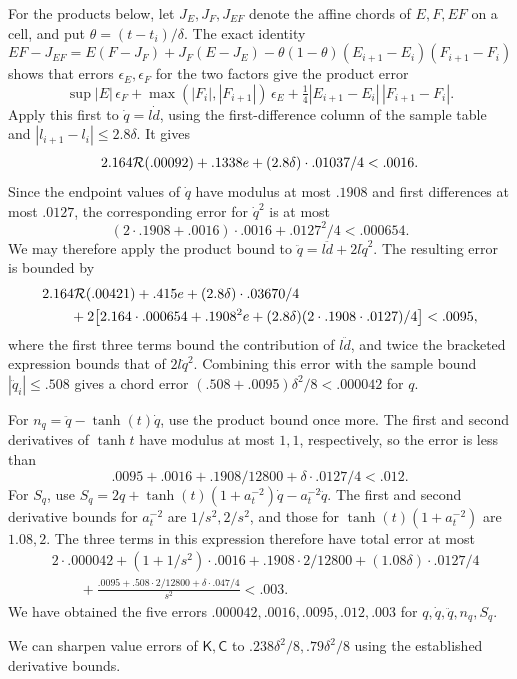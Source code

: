 For the products below, let \(J_E,J_F,J_{EF}\) denote the affine
chords of \(E,F,EF\) on a cell, and put
\(\theta=(t-t_i)/\delta\). The exact identity
\[
 EF-J_{EF}
 =E(F-J_F)+J_F(E-J_E)
  -\theta(1-\theta)(E_{i+1}-E_i)(F_{i+1}-F_i)
\]
shows that errors \(\epsilon_E,\epsilon_F\) for the two factors give
the product error
\[
 \sup|E|\,\epsilon_F+
 \max(|F_i|,|F_{i+1}|)\,\epsilon_E+
 \tfrac14|E_{i+1}-E_i|\,|F_{i+1}-F_i|.
\]
Apply this first to \(\dot q=l\dot d\), using the first-difference
column of the sample table and \(|l_{i+1}-l_i|\le2.8\delta\).
It gives
\[
 2.164{\cal R}(.00092)+.1338e+
       (2.8\delta)\cdot.01037/4<.0016.
\]
Since the endpoint values of \(\dot q\) have modulus at most \(.1908\)
and first differences at most \(.0127\), the corresponding error
for \(\dot q^2\) is at most
\[
 (2\cdot.1908+.0016)\cdot.0016+.0127^2/4<.000654.
\]
We may therefore apply the product bound to
\(\ddot q=l\ddot d+2l\dot q^2\). The resulting error is bounded by
\[
 \begin{aligned}
 &2.164{\cal R}(.00421)+.415 e+(2.8\delta)\cdot.03670/4\\
 &\qquad{}+2\big[2.164\cdot.000654+.1908^2 e
       +(2.8\delta)(2\cdot.1908\cdot.0127)/4\big]<.0095,
 \end{aligned}
\]
where the first three terms bound the contribution of \(l\ddot d\),
and twice the bracketed expression bounds that of \(2l\dot q^2\).
Combining this error with the sample bound
\(|\ddot q_i|\le.508\) gives a chord error
\((.508+.0095)\delta^2/8<.000042\) for \(q\).

For \(n_q=\ddot q-\tanh(t)\dot q\), use the product bound once more.
The first and second derivatives of \(\tanh t\) have modulus at most
\(1,1\), respectively, so the error is less than
\[
 .0095+.0016+.1908/12800+\delta\cdot.0127/4<.012.
\]
For \(S_q\), use
\(S_q=2q+\tanh(t)(1+a_t^{-2})\dot q-a_t^{-2}\ddot q\).
The first and second derivative bounds for \(a_t^{-2}\) are
\(1/s^2,2/s^2\), and those for
\(\tanh(t)(1+a_t^{-2})\) are \(1.08,2\).
The three terms in this expression therefore have total error at most
\[
 \begin{aligned}
 &2\cdot.000042+(1+1/s^2)\cdot.0016+
 .1908\cdot2/12800+(1.08\delta)\cdot.0127/4\\
 &\qquad{}+\frac{.0095+.508\cdot2/12800+\delta\cdot.047/4}{s^2}<.003.
 \end{aligned}
\]
We have obtained the five errors
\(.000042,.0016,.0095,.012,.003\) for
\(q,\dot q,\ddot q,n_q,S_q\).

We can sharpen value errors of \(\mathsf K,\mathsf C\) to \(.238\delta^2/8,.79\delta^2/8\) using the established derivative bounds.

